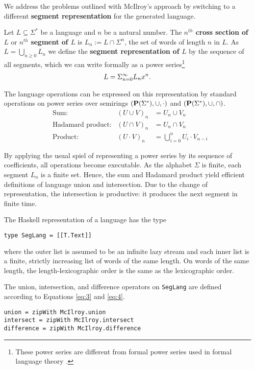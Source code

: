 We address the problems outlined with McIlroy's approach by switching to a
different \textbf{segment representation} for the generated language.

Let $L\subseteq\Sigma^*$ be a language and $n$ be a natural
number. The \textbf{$n^{th}$ cross section of $L$} or
\textbf{$n^{th}$ segment of $L$} is $L_n := L \cap \Sigma^n$, the set of
words of length $n$ in $L$. As $L = \bigcup_{n\ge0} L_n$ we
define the \textbf{segment representation of $L$} by the
sequence of all segments, which we can write formally as a
power series\footnote{These power series are different
  from formal power series used in formal language theory
  \cite{DBLP:books/daglib/0067812,DBLP:books/sp/KuichS86}.}
\begin{gather*}
  L = \Sigma_{n=0}^\infty L_nx^n\text.
\end{gather*}

The language operations can be expressed on this representation by
standard operations on power series over semirings
$(\mathbf{P}(\Sigma^*),\cup,\cdot)$ and $(\mathbf{P}(\Sigma^*), \cup, \cap)$.
\begin{align}
  \label{eq:3}
  &\text{Sum:}
  & (U \cup V)_n &= U_n \cup V_n \\
  \label{eq:4}
  &\text{Hadamard product:}
  & (U \cap V)_n &= U_n \cap V_n \\
  \label{eq:1}
  &\text{Product:}
  & (U \cdot V)_n &= \bigcup_{i=0}^n U_i\cdot V_{n-i}
\end{align}

By applying
the usual spiel of representing a power series by its sequence of
coefficients, all operations become executable.
%
As the alphabet $\Sigma$ is finite, each segment $L_n$ is a finite set. Hence, the sum and
Hadamard product yield efficient definitions of language union and intersection. Due to
the change of representation, the intersection is productive: it produces the next segment
in finite time.

The Haskell representation of a language has the type
\begin{lstlisting}[numbers=none]
type SegLang = [[T.Text]]
\end{lstlisting}
where the outer list is assumed to be an infinite lazy stream and each inner list is
a finite, strictly increasing list of words of the same length. On
words of the same length, the length-lexicographic order is the same
as the lexicographic order.

The union, intersection, and difference operators on
\lstinline{SegLang} are defined according to Equations \eqref{eq:3} and
\eqref{eq:4}.
\begin{lstlisting}[numbers=none]
union = zipWith McIlroy.union
intersect = zipWith McIlroy.intersect
difference = zipWith McIlroy.difference
\end{lstlisting}

